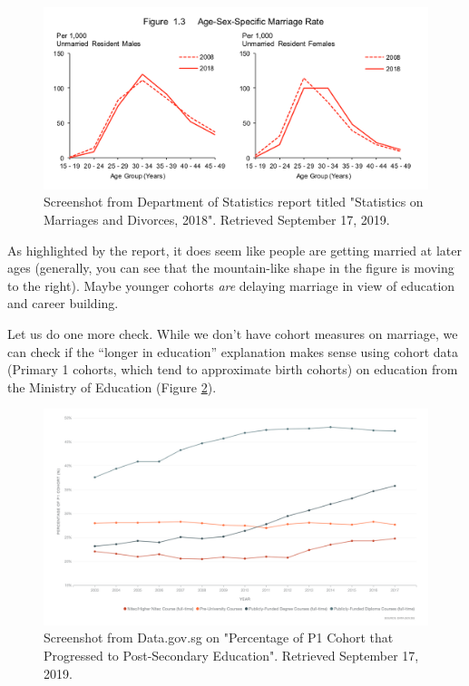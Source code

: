 \documentclass[openany]{book}
\begin{document}
\begin{figure}

{\centering \includegraphics[width=0.8\linewidth]{images/apc/report_fig} 

}

\caption{Screenshot from Department of Statistics report titled "Statistics on Marriages and Divorces,  2018". Retrieved September 17, 2019.}\label{fig:apc-reportsingstat}
\end{figure}

As highlighted by the report, it does seem like people are getting
married at later ages (generally, you can see that the mountain-like
shape in the figure is moving to the right). Maybe younger cohorts
\emph{are} delaying marriage in view of education and career building.

Let us do one more check. While we don't have cohort measures on
marriage, we can check if the ``longer in education'' explanation makes
sense using cohort data (Primary 1 cohorts, which tend to approximate
birth cohorts) on education from the Ministry of Education (Figure
\ref{fig:apc-reportmoe}).

\begin{figure}

{\centering \includegraphics[width=0.95\linewidth]{images/apc/apc_moe} 

}

\caption{Screenshot from Data.gov.sg on "Percentage of P1 Cohort that Progressed to Post-Secondary Education". Retrieved September 17, 2019.}\label{fig:apc-reportmoe}
\end{figure}
\end{document}
